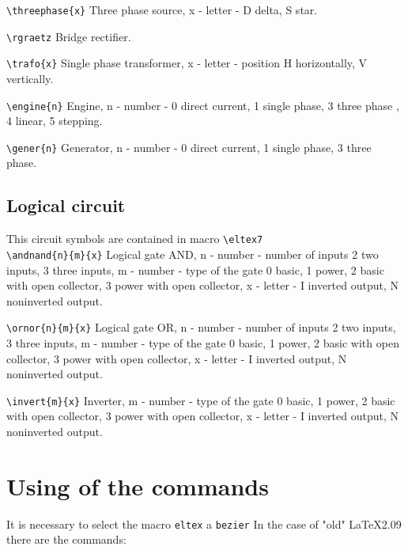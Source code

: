 \noindent
\verb?\threephase{x}?
Three phase source, x - letter - D delta, S star.

\noindent
\verb?\rgraetz?
Bridge rectifier.


\noindent
\verb?\trafo{x}?
Single phase transformer, x - letter - position
H horizontally, V vertically.


\noindent
\verb?\engine{n}?
Engine, n - number - 0  direct current, 1 single phase,
3 three phase ,
4 linear, 5 stepping.

\noindent
\verb?\gener{n}?
Generator, n - number - 0 direct current, 1 single phase,
3 three phase.

\subsection{Logical circuit}

This circuit symbols are contained in macro \verb?\eltex7? \\

\noindent
\noindent
\verb?\andnand{n}{m}{x}?
Logical gate AND, n - number - number of inputs 2 two inputs, 3 three
inputs,
m - number - type of the gate 0 basic, 1 power,  2 basic with open
collector, 3 power with open collector, x - letter - I
inverted output, N noninverted output.


\noindent
\verb?\ornor{n}{m}{x}?
Logical gate OR, n - number - number of inputs 2 two inputs, 3 three
inputs,
m - number - type of the gate 0 basic, 1 power,  2 basic with open
collector, 3 power with open collector, x - letter - I
inverted output, N noninverted output.

\noindent
\verb?\invert{m}{x}?
Inverter,
m - number - type of the gate 0 basic, 1 power,  2 basic with open
collector, 3 power with open collector, x - letter - I
inverted output, N noninverted output.



\section{Using of the commands}
It is necessary to  select the
macro \verb?eltex? a \verb?bezier?   In the case of "old"
\LaTeX  2.09 there are the commands:

